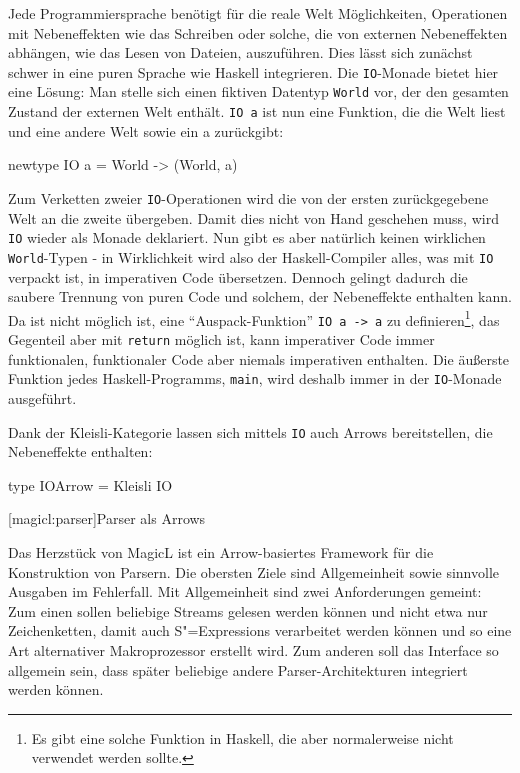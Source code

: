 \documentclass[a4paper, bibgerm]{book}
\newcommand\icode[1]{\lstinline?#1?}
\newcommand\lsection{}
\newcommand{\sexps}{S"=Expressions}
\begin{document}
Jede Programmiersprache benötigt für die reale Welt Möglichkeiten,
Operationen mit Nebeneffekten wie das Schreiben oder solche, die von
externen Nebeneffekten abhängen, wie das Lesen von Dateien,
auszuführen. Dies lässt sich zunächst schwer in eine puren Sprache wie
Haskell integrieren. Die \icode{IO}-Monade bietet hier eine Lösung: Man
stelle sich einen fiktiven Datentyp \icode{World} vor, der den gesamten
Zustand der externen Welt enthält. \icode{IO a} ist nun eine Funktion,
die die Welt liest und eine andere Welt sowie ein a zurückgibt:
\begin{code}
newtype IO a = World -> (World, a)
\end{code}
Zum Verketten zweier \icode{IO}-Operationen wird die von der ersten
zurückgegebene Welt an die zweite übergeben. Damit dies nicht von Hand
geschehen muss, wird \icode{IO} wieder als Monade deklariert. Nun gibt
es aber natürlich keinen wirklichen \icode{World}-Typen - in
Wirklichkeit wird also der Haskell-Compiler alles, was mit \icode{IO}
verpackt ist, in imperativen Code übersetzen. Dennoch gelingt dadurch
die saubere Trennung von puren Code und solchem, der Nebeneffekte
enthalten kann. Da ist nicht möglich ist, eine "`Auspack-Funktion"'
\icode{IO a -> a} zu definieren\footnote{Es gibt eine solche Funktion in
  Haskell, die aber normalerweise nicht verwendet werden sollte.}, das
Gegenteil aber mit \icode{return} möglich ist, kann imperativer Code
immer funktionalen, funktionaler Code aber niemals imperativen
enthalten. Die äußerste Funktion jedes Haskell-Programms, \icode{main},
wird deshalb immer in der \icode{IO}-Monade ausgeführt.

Dank der Kleisli-Kategorie lassen sich mittels \icode{IO} auch Arrows
bereitstellen, die Nebeneffekte enthalten:
\begin{code}
type IOArrow = Kleisli IO
\end{code}

\lsection[magicl:parser]{Parser als Arrows}

Das Herzstück von MagicL ist ein Arrow-basiertes Framework für die
Konstruktion von Parsern. Die obersten Ziele sind Allgemeinheit sowie
sinnvolle Ausgaben im Fehlerfall. Mit Allgemeinheit sind zwei
Anforderungen gemeint: Zum einen sollen beliebige Streams gelesen
werden können und nicht etwa nur Zeichenketten, damit auch \sexps{}
verarbeitet werden können und so eine Art alternativer Makroprozessor
erstellt wird. Zum anderen soll das Interface so allgemein sein, dass
später beliebige andere Parser-Architekturen integriert werden können.
\end{document}
